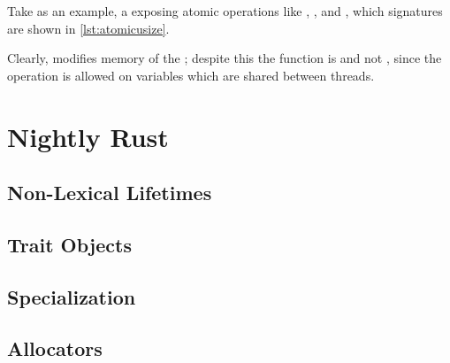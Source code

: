 Take  as an example, a  exposing atomic operations like ,
, and , which signatures are shown in \cref{lst:atomicusize}.

Clearly,  modifies memory of the ; despite this the function
is  and not , since the operation is allowed on variables which are
shared between threads.



\section{Nightly Rust}
\blindtext{}


\subsection{Non-Lexical Lifetimes\label{sec:nll}}
\blindtext{}


\subsection{Trait Objects\label{sec:trait-objects}}
\blindtext{}


\subsection{Specialization\label{sec:specialization}}
\blindtext{}


\subsection{Allocators\label{sec:allocators}}
\blindtext{}
